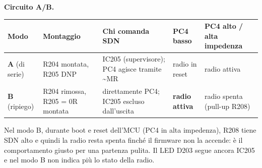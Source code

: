 \textbf{Circuito A/\allowbreak{}B.}

{\footnotesize{}\setlength{\tabcolsep}{4pt}\renewcommand{\arraystretch}{1.1}
\begin{longtable}{>{\raggedright\arraybackslash}p{}>{\raggedright\arraybackslash}p{}>{\raggedright\arraybackslash}p{}>{\raggedright\arraybackslash}p{}>{\raggedright\arraybackslash}p{}}
\toprule
\textbf{Modo} & \textbf{Montaggio} & \textbf{Chi comanda SDN} & \textbf{PC4 basso} & \textbf{PC4 alto /\allowbreak{} alta impedenza} \\
\midrule
\endhead
\bottomrule\endfoot
\textbf{A} (di serie) & R204 montata, R205 DNP & IC205 (supervisore); PC4 agisce tramite \textasciitilde{}MR & radio in reset & radio attiva \\\midrule[0.15pt]
\textbf{B} (ripiego) & R204 rimossa, R205 = 0R montata & direttamente PC4; IC205 escluso dall'uscita & \textbf{radio attiva} & radio spenta (pull-up R208) \\
\end{longtable}}

Nel modo B, durante boot e reset dell'MCU (PC4 in alta impedenza), R208 tiene SDN alto e quindi la radio resta spenta finché il firmware non la accende: è il comportamento giusto per una partenza pulita. Il LED D203 segue ancora IC205 e nel modo B non indica più lo stato della radio.

